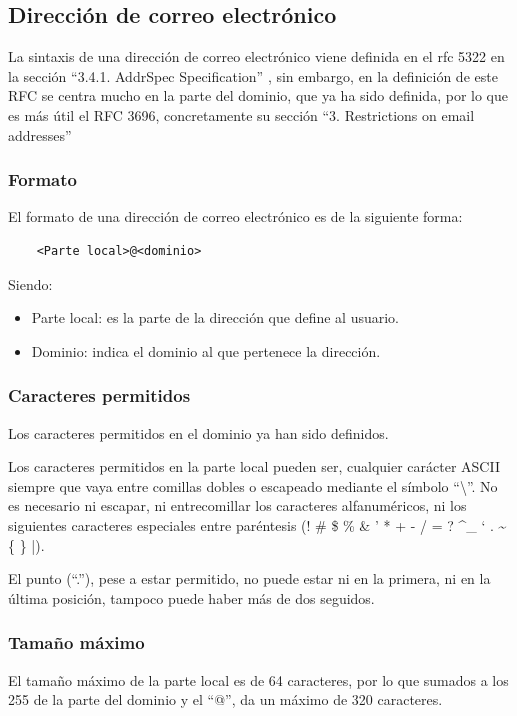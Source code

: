 \subsection{Dirección de correo electrónico}
La sintaxis de una dirección de correo electrónico viene definida en el rfc 5322 en la sección “3.4.1.  Addr\-Spec Specification” \cite{rfc5322_section_3_4_1}, sin embargo, en la definición de este RFC se centra mucho en la parte del dominio, que ya ha sido definida, por lo que es más útil el RFC 3696, concretamente su sección “3. Restrictions on email addresses” \cite{rfc3696_section_3}

\subsubsection{Formato}
El formato de una dirección de correo electrónico es de la siguiente forma: 
\begin{verbatim}
    <Parte local>@<dominio>
\end{verbatim}

Siendo:
\begin{itemize}
    \item Parte local: es la parte de la dirección que define al usuario.
    \item Dominio: indica el dominio al que pertenece la dirección.
\end{itemize} 

\subsubsection{Caracteres permitidos}
Los caracteres permitidos en el dominio ya han sido definidos.

Los caracteres permitidos en la parte local pueden ser, cualquier carácter ASCII siempre que vaya entre comillas dobles o escapeado mediante el símbolo “\textbackslash”. No es necesario ni escapar, ni entrecomillar los caracteres alfanuméricos, ni los siguientes caracteres especiales entre paréntesis (! \# \$ \% \& ' * + - / = ?  \textasciicircum \_ ` . \textasciitilde \{ \} |).

El punto (“.”), pese a estar permitido, no puede estar ni en la primera, ni en la última posición, tampoco puede haber más de dos seguidos. 

\subsubsection{Tamaño máximo}
El tamaño máximo de la parte local es de 64 caracteres, por lo que sumados a los 255 de la parte del dominio y el “@”, da un máximo de 320 caracteres. 

